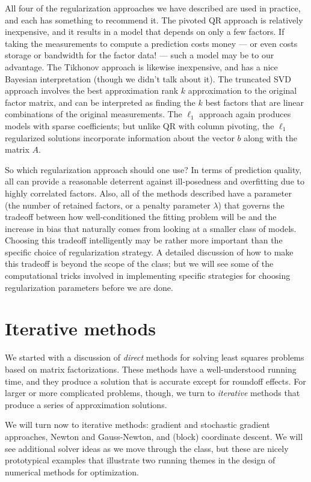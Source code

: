 \documentclass[12pt, leqno]{article} %
\begin{document}
All four of the regularization approaches we have described are used
in practice, and each has something to recommend it.  The pivoted QR
approach is relatively inexpensive, and it results in a model that
depends on only a few factors.  If taking the measurements to compute
a prediction costs money --- or even costs storage or bandwidth for
the factor data! --- such a model may be to our advantage.  The
Tikhonov approach is likewise inexpensive, and has a nice Bayesian
interpretation (though we didn't talk about it).  The truncated SVD
approach involves the best approximation rank $k$ approximation to the
original factor matrix, and can be interpreted as finding the $k$ best
factors that are linear combinations of the original measurements.
The $\ell_1$ approach again produces models with sparse coefficients;
but unlike QR with column pivoting, the $\ell_1$ regularized solutions
incorporate information about the vector $b$ along with the matrix $A$.

So which regularization approach should one use?  In terms of
prediction quality, all can provide a reasonable deterrent against
ill-posedness and overfitting due to highly correlated factors.  Also,
all of the methods described have a parameter (the number of retained
factors, or a penalty parameter $\lambda$) that governs the tradeoff
between how well-conditioned the fitting problem will be and the
increase in bias that naturally comes from looking at a smaller class
of models.  Choosing this tradeoff intelligently may be rather more
important than the specific choice of regularization strategy.  A
detailed discussion of how to make this tradeoff is beyond the scope
of the class; but we will see some of the computational tricks
involved in implementing specific strategies for choosing
regularization parameters before we are done.

\section{Iterative methods}

We started with a discussion of {\em direct} methods
for solving least squares problems based on matrix factorizations.
These methods have a well-understood running time, and they produce
a solution that is accurate except for roundoff effects.  For larger
or more complicated problems, though, we turn to
{\em iterative} methods that produce a series of approximation
solutions.

We will turn now to iterative methods: gradient and stochastic
gradient approaches, Newton and Gauss-Newton, and (block) coordinate
descent.  We will see additional solver ideas as we move through the
class, but these are nicely prototypical examples that illustrate
two running themes in the design of numerical methods for
optimization.
\end{document}
